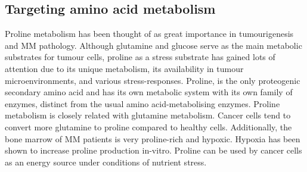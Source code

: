 \subsection{Targeting amino acid metabolism}
Proline metabolism has been thought of as great importance in tumourigenesis and MM pathology.
Although glutamine and glucose serve as the main metabolic substrates for tumour cells, proline as a stress substrate has gained lots of attention due to its unique metabolism, its availability in tumour microenvironments, and various stress-responses\cite{liu2013mirna}.
Proline, is the only proteogenic secondary amino acid and has its own metabolic system with its own family of enzymes, distinct from the usual amino acid-metabolising enzymes\cite{liu2013mirna}.
Proline metabolism is closely related with glutamine metabolism.
Cancer cells tend to convert more glutamine to proline compared to healthy cells.
Additionally, the bone marrow of MM patients is very proline-rich and hypoxic.
Hypoxia has been shown to increase proline production in-vitro.
Proline can be used by cancer cells as an energy source under conditions of nutrient stress\cite{phang2008metabolism}.

